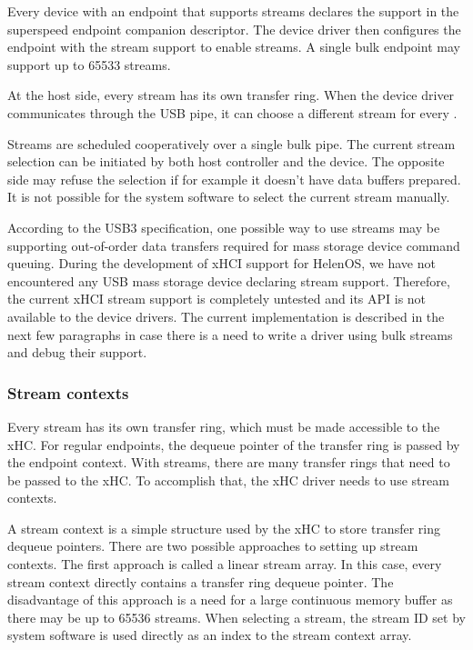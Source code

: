 Every device with an endpoint that supports streams declares the support in the
superspeed endpoint companion descriptor. The device driver then
configures the endpoint with the stream support to enable streams. A single
bulk endpoint may support up to 65533 streams.

At the host side, every stream has its own transfer ring. When the device
driver communicates through the USB pipe, it can choose a different stream for
every .

Streams are scheduled cooperatively over a single bulk pipe. The current stream
selection can be initiated by both host controller and the device. The opposite
side may refuse the selection if for example it doesn't have data buffers
prepared. It is not possible for the system software to select the current
stream manually.

According to the USB3 specification, one possible way to use streams may be
supporting out-of-order data transfers required for mass storage device command
queuing. During the development of xHCI support for HelenOS, we have not
encountered any USB mass storage device declaring stream support. Therefore,
the current xHCI stream support is completely untested and its API is not
available to the device drivers. The current implementation is described in the
next few paragraphs in case there is a need to write a driver using bulk
streams and debug their support.

\subsubsection{Stream contexts}

Every stream has its own transfer ring, which must be made
accessible to the xHC. For regular endpoints, the dequeue pointer of the
transfer ring is passed by the endpoint context. With streams, there are many
transfer rings that need to be passed to the xHC. To accomplish that, the
xHC driver needs to use stream contexts.

A stream context is a simple structure used by the xHC to store transfer ring
dequeue pointers. There are two possible approaches to setting up stream
contexts. The first approach is called a linear stream array. In this case,
every stream context directly contains a transfer ring dequeue pointer. The
disadvantage of this approach is a need for a large continuous memory buffer as
there may be up to 65536 streams. When selecting a stream, the stream ID set by
system software is used directly as an index to the stream context array.

